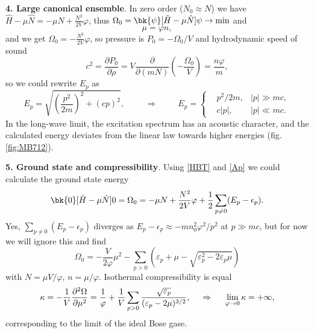 \textbf{4. Large canonical ensemble}. In zero order ($N_0 \approx N$) we have $\hat{H} - \mu \hat{N} = - \mu N + \frac{N^2}{2V}\varphi$, thus $\Omega_0 = \bk{\psi}[\hat{H}- \mu \hat{N}]{\psi} \to \min $ and 
\begin{equation*}
	\mu = \varphi n,
\end{equation*}
and we get $\Omega_0 = - \frac{N^2}{2V} \varphi$, so pressure is $P_0 = - \Omega_0 /V$ and hydrodynamic speed of sound
\begin{equation*}
	c^2 = \frac{\partial P_0}{\partial \rho} = V \frac{\partial }{\partial (m N)} \left(- \frac{\Omega_0}{V}\right) = \frac{n \varphi}{m},
\end{equation*}
so we could  rewrite $E_p$ as
\begin{equation}
	E_p = \sqrt{\left(\frac{p^2}{2m}\right)^2 + (cp)^2},
	\hspace{1cm} \Rightarrow \hspace{1cm}
	E_p = \left\{\begin{aligned}
	    &p^2 / 2m, &|p| \gg mc, \\
	    &c |p| , &|p| \ll mc.
	\end{aligned}\right.
\end{equation}
In the long-wave limit, the excitation spectrum has an acoustic character, and the calculated energy deviates from the linear law towards higher energies (fig. \ref{fig:MB712}).


\textbf{5. Ground state and compressibility}. Using \eqref{HBT} and \eqref{Ap} we could calculate the ground state energy
\begin{equation}
	\bk{0}[\hat{H} - \mu \hat{N}]{0} = \Omega_0 = - \mu N + \frac{N^2}{2V}\varphi +\frac{1}{2} \sum_{p \neq 0} (E_p - \epsilon_p).
	\label{BECgs}
\end{equation}
Yes, $\sum_{p \neq 0} (E_p - \epsilon_p)$ diverges as $E_p - \epsilon_p \approx - m n_0^2 \varphi^2 / p^2$ at $p \gg mc$, but for now we will ignore this and find 
\begin{equation*}
	\Omega_0 = - \frac{V}{2\varphi} \mu^2 - \sum_{p > 0} \left(
		\varepsilon_p + \mu - \sqrt{\varepsilon_p^2 - 2 \varepsilon_p \mu} 
	\right)
\end{equation*}
with $N = \mu V  / \varphi$, $n = \mu / \varphi$. Isothermal compressibility is equal
\begin{equation*}
	\kappa = - \frac{1}{V} \frac{\partial^2 \Omega}{\partial \mu^2} = \frac{1}{\varphi} + \frac{1}{V} \sum_{p > 0} \frac{\sqrt{\varepsilon_p}}{(\varepsilon_p -2\mu)^{3/2}},
	\hspace{0.5cm} \Rightarrow \hspace{0.5cm}
	\lim_{\varphi \to 0} \kappa = +\infty,
\end{equation*}
corresponding to the limit of the ideal Bose gase. 


